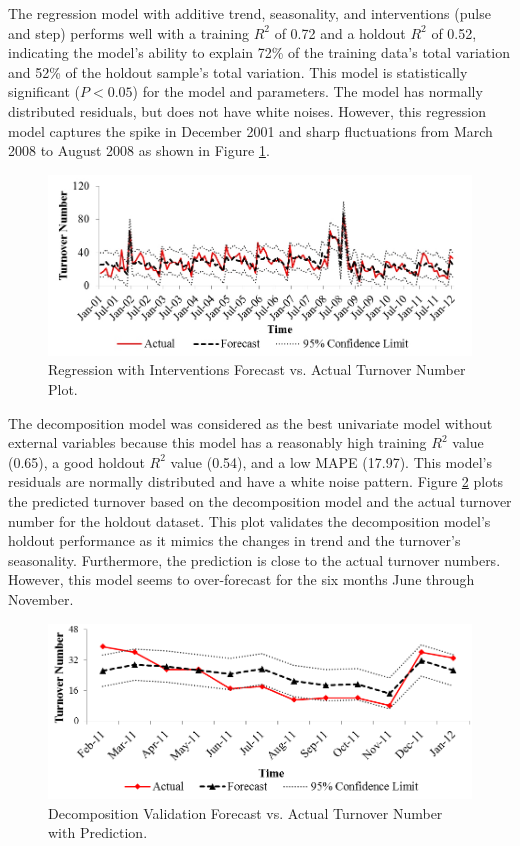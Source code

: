 The regression model with additive trend, seasonality, and interventions (pulse and step) performs well with a training  $R^2$ of 0.72 and a holdout $R^2$ of 0.52, indicating the model's ability to explain 72\% of the training data's total variation and 52\% of the holdout sample's total variation. This model is statistically significant ($P<0.05$) for the model and parameters. The model has normally distributed residuals, but does not have white noises. However, this regression model captures the spike in December 2001 and sharp fluctuations from March 2008 to August 2008 as shown in Figure \ref{fig:4}. 
\begin{figure}
	\centering
	\includegraphics[width=5.5in]{Fig4.jpg}
	\caption{Regression with Interventions Forecast vs. Actual Turnover Number Plot.}
	\label{fig:4}
\end{figure}
The decomposition model was considered as the best univariate model without external variables because this model has a reasonably high training $R^2$ value (0.65), a good holdout $R^2$ value (0.54), and a low MAPE (17.97). This model's residuals are normally distributed and have a white noise pattern. Figure \ref{fig:5} plots the predicted turnover based on the decomposition model and the actual turnover number for the holdout dataset. This plot validates the decomposition model's holdout performance as it mimics the changes in trend and the turnover's seasonality. Furthermore, the prediction is close to the actual turnover numbers. However, this model seems to over-forecast for the six months  June through November.
\begin{figure}
	\centering
	\includegraphics[width=5.5in]{Fig5.png}
	\caption{Decomposition Validation Forecast vs. Actual Turnover Number with Prediction.}
	\label{fig:5}
\end{figure}

